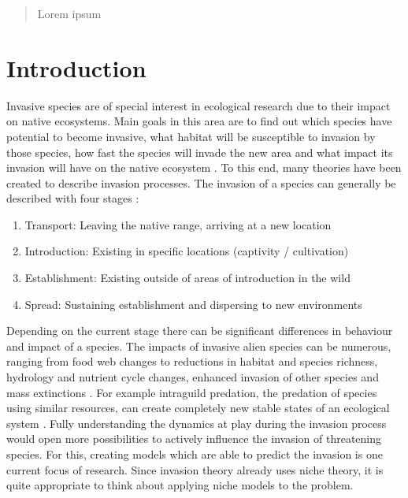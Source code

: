 \documentclass[12pt,a4paper]{article}
\begin{document}
\newpage
\thispagestyle{empty}
\begin{abstract}
    Lorem ipsum
\end{abstract}

\newpage
\tableofcontents
\thispagestyle{empty}
\newpage
{}

\section{Introduction} \label{sec:introduction}
Invasive species are of special interest in ecological research due to their impact on native ecosystems.
Main goals in this area are to find out which species have potential to become invasive, what habitat will be susceptible to invasion by those species, how fast the species will invade the new area and what impact its invasion will have on the native ecosystem \autocite{shigesada1997invasions}.
To this end, many theories have been created to describe invasion processes.
The invasion of a species can  generally be described with four stages \autocite{blackburn2011invasionstages}:
\begin{enumerate} %
    \item Transport: Leaving the native range, arriving at a new location
    \item Introduction: Existing in specific locations (captivity / cultivation)
    \item Establishment: Existing outside of areas of introduction in the wild
    \item Spread: Sustaining establishment and dispersing to new environments
\end{enumerate}
Depending on the current stage there can be significant differences in behaviour and impact of a species.
The impacts of invasive alien species can be numerous, ranging from food web changes to reductions in habitat and species richness, hydrology and nutrient cycle changes, enhanced invasion of other species and mass extinctions \autocite{simberloff2013invasiveimpacts}.
For example intraguild predation, the predation of species using similar resources, can create completely new stable states of an ecological system \autocite{polis1989theoryIGP}.
Fully understanding the dynamics at play during the invasion process would open more possibilities to actively influence the invasion of threatening species.
For this, creating models which are able to predict the invasion is one current focus of research.
Since invasion theory already uses niche theory, it is quite appropriate to think about applying niche models to the problem.
\end{document}
